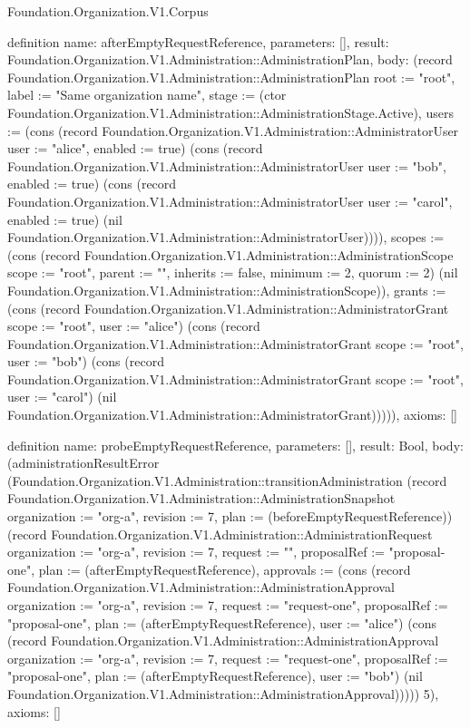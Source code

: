 \begin{lexlean}{Foundation.Organization.V1.Corpus}
\begin{semanticmodule}
definition{
  name: afterEmptyRequestReference,
  parameters: [],
  result: Foundation.Organization.V1.Administration::AdministrationPlan,
  body: (record Foundation.Organization.V1.Administration::AdministrationPlan {root := "root", label := "Same organization name", stage := (ctor Foundation.Organization.V1.Administration::AdministrationStage.Active), users := (cons (record Foundation.Organization.V1.Administration::AdministratorUser {user := "alice", enabled := true}) (cons (record Foundation.Organization.V1.Administration::AdministratorUser {user := "bob", enabled := true}) (cons (record Foundation.Organization.V1.Administration::AdministratorUser {user := "carol", enabled := true}) (nil Foundation.Organization.V1.Administration::AdministratorUser)))), scopes := (cons (record Foundation.Organization.V1.Administration::AdministrationScope {scope := "root", parent := "", inherits := false, minimum := 2, quorum := 2}) (nil Foundation.Organization.V1.Administration::AdministrationScope)), grants := (cons (record Foundation.Organization.V1.Administration::AdministratorGrant {scope := "root", user := "alice"}) (cons (record Foundation.Organization.V1.Administration::AdministratorGrant {scope := "root", user := "bob"}) (cons (record Foundation.Organization.V1.Administration::AdministratorGrant {scope := "root", user := "carol"}) (nil Foundation.Organization.V1.Administration::AdministratorGrant))))}),
  axioms: []
}

definition{
  name: probeEmptyRequestReference,
  parameters: [],
  result: Bool,
  body: (administrationResultError (Foundation.Organization.V1.Administration::transitionAdministration (record Foundation.Organization.V1.Administration::AdministrationSnapshot {organization := "org-a", revision := 7, plan := (beforeEmptyRequestReference)}) (record Foundation.Organization.V1.Administration::AdministrationRequest {organization := "org-a", revision := 7, request := "", proposalRef := "proposal-one", plan := (afterEmptyRequestReference), approvals := (cons (record Foundation.Organization.V1.Administration::AdministrationApproval {organization := "org-a", revision := 7, request := "request-one", proposalRef := "proposal-one", plan := (afterEmptyRequestReference), user := "alice"}) (cons (record Foundation.Organization.V1.Administration::AdministrationApproval {organization := "org-a", revision := 7, request := "request-one", proposalRef := "proposal-one", plan := (afterEmptyRequestReference), user := "bob"}) (nil Foundation.Organization.V1.Administration::AdministrationApproval)))})) 5),
  axioms: []
}


\end{semanticmodule}
\end{lexlean}
